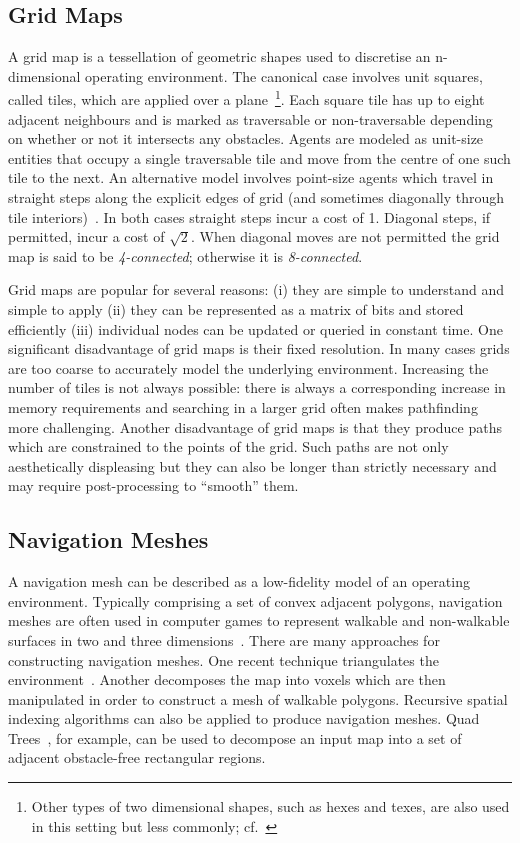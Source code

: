\subsection{Grid Maps}
\label{cha::lit::graphs::grid}
A grid map is a tessellation of geometric shapes used to discretise an n-dimensional
operating environment. The canonical case involves unit squares, called tiles, 
which are applied over a plane~\footnote{Other types of two dimensional shapes,
such as hexes and texes, are also used in this setting but less commonly; cf.~\citep{yap02}}.
Each square tile has up to eight adjacent neighbours and is marked 
as traversable or non-traversable depending on whether or not it
intersects any obstacles.  Agents are modeled as unit-size entities that
occupy a single traversable tile and move from the centre of one such tile 
to the next.  
An alternative model involves point-size agents which travel in straight 
steps along the explicit edges of grid (and sometimes diagonally through 
tile interiors)~\citep{nash07}.
In both cases straight steps incur a cost of 1. Diagonal steps, if permitted, 
incur a cost of $\sqrt{2}$.  When diagonal moves are not permitted the grid map 
is said to be \emph{4-connected}; otherwise it is \emph{8-connected}.  

Grid maps are popular for several reasons: (i) they are simple to understand 
and simple to apply (ii) they can be represented as a matrix of bits and stored
efficiently (iii) individual nodes can be updated or queried in constant time.
One significant disadvantage of grid maps is their fixed resolution. In many cases 
grids are too coarse to accurately model the underlying environment. Increasing the
number of tiles is not always possible: there is always a corresponding increase in
memory requirements and searching in a larger grid often makes pathfinding more 
challenging.
Another disadvantage of grid maps is that they produce paths which are
constrained to the points of the grid. Such paths are not only aesthetically
displeasing but they can also be longer than strictly necessary and may
require post-processing to ``smooth'' them.

\subsection{Navigation Meshes}
\label{cha::lit::graphs::nav}
A navigation mesh can be described as a low-fidelity model of an operating environment.
Typically comprising a set of convex adjacent polygons, navigation meshes are
often used in computer games to represent walkable and non-walkable surfaces in
two and three dimensions~\citep{snook00,tozour02}.
There are many approaches for constructing navigation meshes.
One recent technique triangulates the environment~\citep{demyen07,kallmann10}.  
Another decomposes the map into voxels which are then manipulated in order to construct a 
mesh of walkable polygons. 
Recursive spatial indexing algorithms can also be applied to produce navigation meshes. 
Quad Trees~\citep{finkel74,samet85}, for example, can be used to decompose an input
map into a set of adjacent obstacle-free rectangular regions. 

